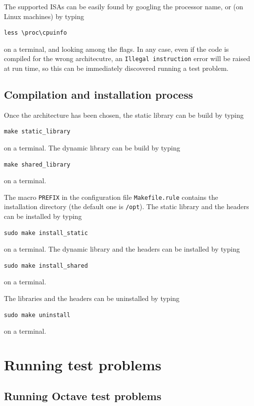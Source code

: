 \documentclass[a4paper]{report}
\begin{document}
The supported ISAs can be easily found by googling the processor name, or (on Linux machines) by typing
\begin{verbatim}
less \proc\cpuinfo
\end{verbatim}
on a terminal, and looking among the flags. 
In any case, even if the code is compiled for the wrong architecutre, an {\tt Illegal instruction} error will be raised at run time, so this can be immediately discovered running a test problem.

\section{Compilation and installation process}

Once the architecture has been chosen, the static library can be build by typing
\begin{verbatim}
make static_library
\end{verbatim}
on a terminal. The dynamic library can be build by typing
\begin{verbatim}
make shared_library
\end{verbatim}
on a terminal.

The macro {\tt PREFIX} in the configuration file {\tt Makefile.rule} contains the installation directory (the default one is {\tt /opt}).
The static library and the headers can be installed by typing
\begin{verbatim}
sudo make install_static
\end{verbatim}
on a terminal. The dynamic library and the headers can be installed by typing
\begin{verbatim}
sudo make install_shared
\end{verbatim}
on a terminal.

The libraries and the headers can be uninstalled by typing
\begin{verbatim}
sudo make uninstall
\end{verbatim}
on a terminal.



\chapter{Running test problems}

\section{Running Octave test problems}
\end{document}
